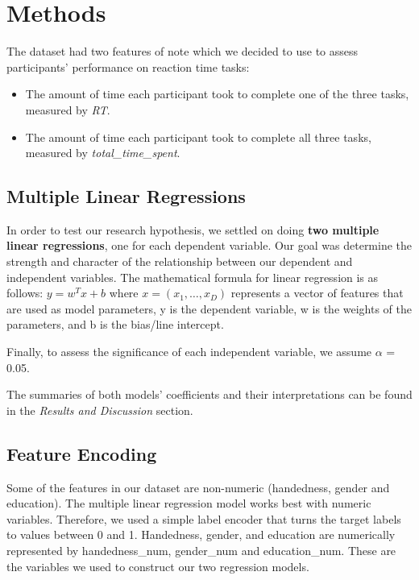 \documentclass[
]{article}
\providecommand{\tightlist}{%
  \setlength{\itemsep}{0pt}\setlength{\parskip}{0pt}}
\begin{document}
\hypertarget{methods}{%
\section{Methods}\label{methods}}

The dataset had two features of note which we decided to use to assess
participants' performance on reaction time tasks:

\begin{itemize}
\tightlist
\item
  The amount of time each participant took to complete one of the three
  tasks, measured by \emph{RT}.
\item
  The amount of time each participant took to complete all three tasks,
  measured by \emph{total\_time\_spent}.
\end{itemize}

\hypertarget{multiple-linear-regressions}{%
\subsection{Multiple Linear
Regressions}\label{multiple-linear-regressions}}

In order to test our research hypothesis, we settled on doing
\textbf{two multiple linear regressions}, one for each dependent
variable. Our goal was determine the strength and character of the
relationship between our dependent and independent variables. The
mathematical formula for linear regression is as follows:
\(y = w^T x + b\) where \(x = (x_1, …, x_D)\) represents a vector of
features that are used as model parameters, y is the dependent variable,
w is the weights of the parameters, and b is the bias/line intercept.

Finally, to assess the significance of each independent variable, we
assume \(\alpha\) = 0.05.

The summaries of both models' coefficients and their interpretations can
be found in the \emph{Results and Discussion} section.

\hypertarget{feature-encoding}{%
\subsection{Feature Encoding}\label{feature-encoding}}

Some of the features in our dataset are non-numeric (handedness, gender
and education). The multiple linear regression model works best with
numeric variables. Therefore, we used a simple label encoder that turns
the target labels to values between 0 and 1. Handedness, gender, and
education are numerically represented by handedness\_num, gender\_num
and education\_num. These are the variables we used to construct our two
regression models.
\end{document}
